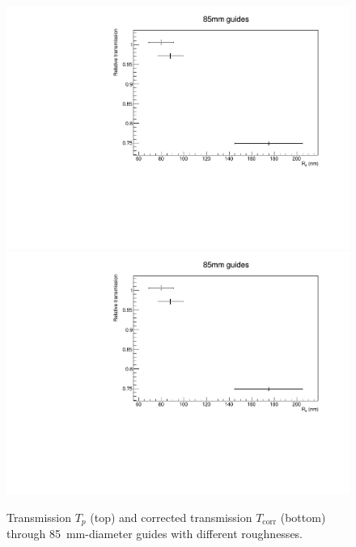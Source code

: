 \documentclass[10pt,letterpaper]{article}
\begin{document}
\begin{figure}
\centering
\includegraphics[width=\textwidth,page=1]{../transmission_with_prestorage/transmission85mm.pdf}
\includegraphics[width=\textwidth,page=2]{../transmission_with_prestorage/transmission85mm.pdf}
\caption{Transmission $T_p$ (top) and corrected transmission $T_\mathrm{corr}$ (bottom) through \SI{85}{\milli\meter}-diameter guides with different roughnesses.}
\label{fig:transmission85}
\end{figure}
\end{document}
